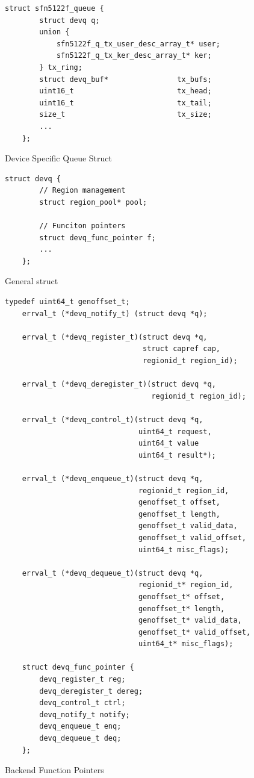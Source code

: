 \documentclass[a4paper,11pt,twoside]{report}
\begin{document}
\begin{figure}[h]
	\caption{Device Specific Queue Struct}
	\begin{lstlisting}[style=code]
    struct sfn5122f_queue {
        struct devq q;
        union {
            sfn5122f_q_tx_user_desc_array_t* user;
            sfn5122f_q_tx_ker_desc_array_t* ker;
        } tx_ring;
        struct devq_buf*                tx_bufs;
        uint16_t                        tx_head;
        uint16_t                        tx_tail;
        size_t                          tx_size;
        ...
    };
	\end{lstlisting}
	\label{lst:sfn5122f}
\end{figure}  

\begin{figure}[h]
	\caption{General \devif struct}
	\begin{lstlisting}[style=code]
    struct devq {
        // Region management
        struct region_pool* pool;
        
        // Funciton pointers
        struct devq_func_pointer f;
        ...
    };
	\end{lstlisting}
	\label{lst:devq}
\end{figure}  

\begin{figure}[H]
	\caption{Backend Function Pointers}
	\begin{lstlisting}[style=code]
    typedef uint64_t genoffset_t;
    errval_t (*devq_notify_t) (struct devq *q);
	
    errval_t (*devq_register_t)(struct devq *q,
                                struct capref cap,
                                regionid_t region_id);
                                
    errval_t (*devq_deregister_t)(struct devq *q, 
                                  regionid_t region_id);
	
    errval_t (*devq_control_t)(struct devq *q,
	                           uint64_t request,
	                           uint64_t value
	                           uint64_t result*);
	
    errval_t (*devq_enqueue_t)(struct devq *q, 
	                           regionid_t region_id,
	                           genoffset_t offset,
	                           genoffset_t length,
	                           genoffset_t valid_data,
	                           genoffset_t valid_offset,
	                           uint64_t misc_flags);
	
    errval_t (*devq_dequeue_t)(struct devq *q,
                               regionid_t* region_id,
                               genoffset_t* offset,
                               genoffset_t* length,
                               genoffset_t* valid_data,
                               genoffset_t* valid_offset,
                               uint64_t* misc_flags);
	
    struct devq_func_pointer {
        devq_register_t reg;
        devq_deregister_t dereg;
        devq_control_t ctrl;
        devq_notify_t notify;
        devq_enqueue_t enq;
        devq_dequeue_t deq;
    };
	\end{lstlisting}
	\label{lst:func_p}
\end{figure}  
\end{document}
